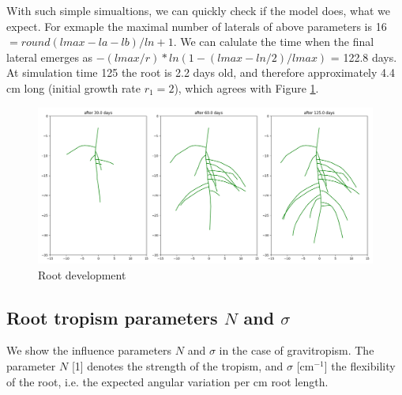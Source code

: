 With such simple simualtions, we can quickly check if the model does, what we expect. For exmaple the maximal number of laterals of above parameters is 16 
$= round(lmax - la - lb)/ln +  1$. We can calulate the time when the final lateral emerges as $-(lmax/r)*ln(1-(lmax-ln/2)/lmax)$ = 122.8 days. At simulation time 125 the root is 2.2 days old, and therefore approximately 4.4 cm long (initial growth rate $r_1 = 2$), which agrees with Figure \ref{fig:ip}.



\begin{figure}
\centering
\includegraphics[width=\textwidth]{fig_initializeparams.png}
\caption{Root development} \label{fig:ip}
\end{figure}



\subsection{Root tropism parameters $N$ and $\sigma$} \label{ssec:tropism}

We show the influence parameters $N$ and $\sigma$ in the case of gravitropism. The parameter $N$ [1] denotes the strength of the tropism, and $\sigma$ [cm$^{-1}$] the flexibility of the root, i.e. the expected angular variation per cm root length. 



